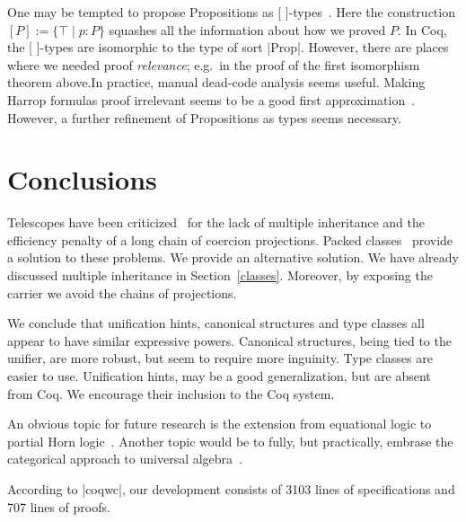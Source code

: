 \documentclass[a4paper,10pt,runningheads]{llncs}
\begin{document}
One may be tempted to propose Propositions as [ ]-types~\cite{awodey2004propositions}. Here the
construction $[P]:=\{\top\mid p:P\}$ squashes all the information about how we proved $P$. In Coq,
the [ ]-types are isomorphic to the type of sort |Prop|. However,
there are places where we needed proof \emph{relevance}; e.g.\ in the proof of the first isomorphism
theorem above.In practice, manual dead-code analysis seems useful. Making Harrop formulas proof
irrelevant seems to be a good first approximation~\cite{lcf:spi:03}. However, a further refinement
of Propositions as types seems necessary.

\section{Conclusions}
Telescopes have been criticized~\cite{Packed} for the lack of multiple inheritance and
the efficiency penalty of a long chain of coercion projections. Packed classes~\cite{Packed} provide
a solution to these problems. We provide an alternative solution. We have already
discussed multiple inheritance in Section~\ref{classes}. Moreover, by exposing the
carrier we avoid the chains of projections.

We conclude that unification hints, canonical structures and type classes all appear to have
similar expressive powers. Canonical structures, being tied to the unifier, are more robust, but
seem to require more inguinity. Type classes are easier to use. Unification hints, may be a
good generalization, but are absent from Coq. We encourage their inclusion to the
Coq system.

An obvious topic for future research is the extension from equational logic to partial Horn
logic~\cite{palmgren2007partial}. Another topic would be to fully, but practically, embrase the
categorical approach to universal algebra~\cite{pitts2001categorical}.

According to |coqwc|, our development consists of 3103 lines of specifications and 707 lines of
proofs.


% 
\end{document}
